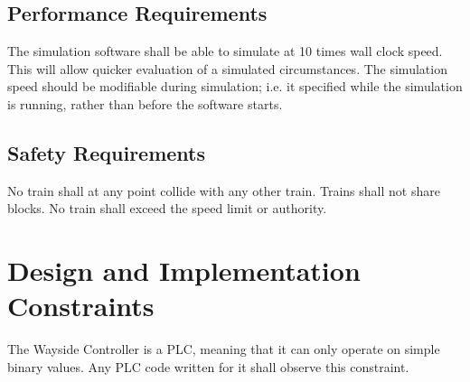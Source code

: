 \documentclass{scrreprt}
\begin{document}
\subsection{Performance Requirements}
The simulation software shall be able to simulate at 10 times wall clock speed.
This will allow quicker evaluation of a simulated circumstances. The simulation
speed should be modifiable during simulation; i.e. it specified while the simulation
is running, rather than before the software starts.

\subsection{Safety Requirements}
No train shall at any point collide with any other train. Trains shall not share blocks. No train shall exceed
the speed limit or authority.

\section{Design and Implementation Constraints}
\begin{numonly}
    \item The Wayside Controller is a PLC, meaning that it can only operate on simple binary values. Any PLC code written for it shall observe this constraint.
\end{numonly}



\end{document}
